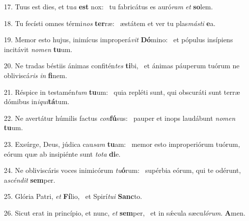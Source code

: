 17. Tuus est dies, et tu\textit{a} \textbf{est} nox: \ast\  tu fabricátus es auró\textit{ram} \textit{et} \textbf{so}lem.\

18. Tu fecísti omnes térmi\textit{nos} \textbf{ter}ræ: \ast\  æstátem et ver tu plas\textit{más}\textit{ti} \textbf{e}a.\

19. Memor esto hujus, inimícus improperá\textit{vit} \textbf{Dó}mino: \ast\  et pópulus insípiens incitávit \textit{no}\textit{men} \textbf{tu}um.\

20. Ne tradas béstiis ánimas confitén\textit{tes} \textbf{ti}bi, \ast\  et ánimas páuperum tuórum ne obliviscá\textit{ris} \textit{in} \textbf{fi}nem.\

21. Réspice in testamén\textit{tum} \textbf{tu}um: \ast\  quia repléti sunt, qui obscuráti sunt terræ dómibus in\textit{i}\textit{qui}\textbf{tá}tum.\

22. Ne avertátur húmilis factus \textit{con}\textbf{fú}sus: \ast\  pauper et inops laudábunt \textit{no}\textit{men} \textbf{tu}um.\

23. Exsúrge, Deus, júdica cau\textit{sam} \textbf{tu}am: \ast\  memor esto improperiórum tuórum, eórum quæ ab insipiénte sunt \textit{to}\textit{ta} \textbf{di}e.\

24. Ne obliviscáris voces inimicórum \textit{tu}\textbf{ó}rum: \ast\  supérbia eórum, qui te odérunt, a\textit{scén}\textit{dit} \textbf{sem}per.\

25. Glória Patri, \textit{et} \textbf{Fí}lio, \ast\  et Spirí\textit{tu}\textit{i} \textbf{Sanc}to.\

26. Sicut erat in princípio, et nunc, \textit{et} \textbf{sem}per, \ast\  et in sǽcula sæcu\textit{ló}\textit{rum}. \textbf{A}men.\


